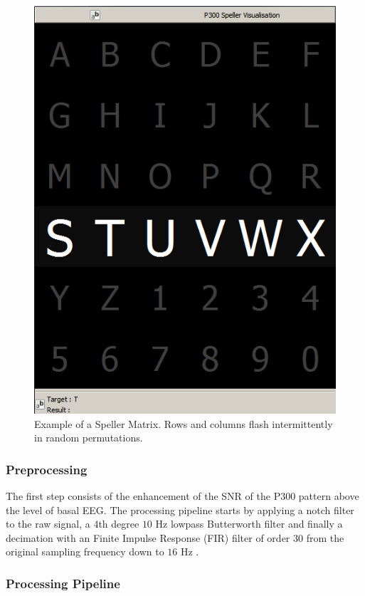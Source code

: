 \documentclass[entropy,article,submit,moreauthors,pdftex,10pt,a4paper]{mdpi}
\begin{document}
\begin{figure}[H]
\centering
\includegraphics[width=.49\linewidth]{openvibep300matrix.png}
\caption{Example of a Speller Matrix.  Rows and columns flash intermittently in random permutations.}
\label{fig:p300matrix}
\end{figure}



\subsubsection{Preprocessing} \label{Preprocessing}

The first step consists of the enhancement of the SNR of the P300 pattern above the level of basal EEG. 
The processing pipeline starts by applying a notch filter to the raw signal, a 
$4$th degree $10$ Hz lowpass Butterworth filter and finally a decimation with an Finite Impulse Response (FIR) filter of order $30$ from the original sampling frequency down to $16$ Hz \citep{Krusienski2006}.

\subsubsection{Processing Pipeline} \label{Pipeline}
\end{document}
